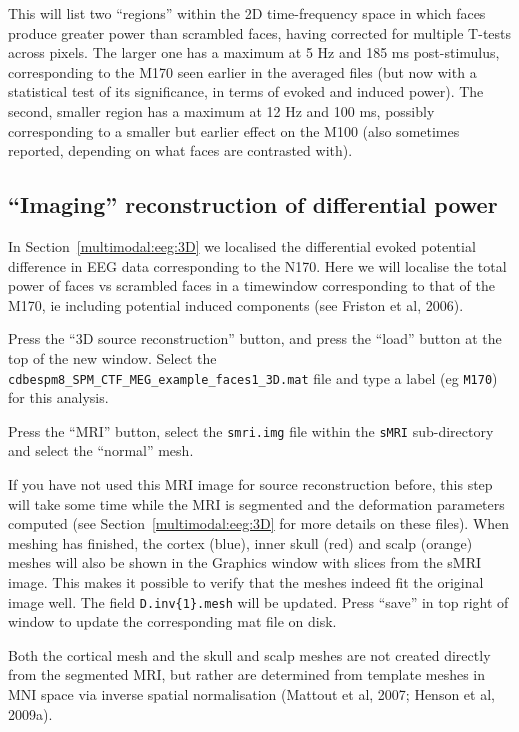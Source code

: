 This will list two ``regions'' within the 2D time-frequency space in which faces produce greater power than scrambled faces, having corrected for multiple T-tests across pixels. The larger one has a maximum at 5 Hz and 185 ms post-stimulus, corresponding to the M170 seen earlier in the averaged files (but now with a statistical test of its significance, in terms of evoked and induced power). The second, smaller region has a maximum at 12 Hz and 100 ms, possibly corresponding to a smaller but earlier effect on the M100 (also sometimes reported, depending on what faces are contrasted with).

\subsection{``Imaging'' reconstruction of differential power\label{multimodal:data:meg:recon_pow}}

In Section~\ref{multimodal:eeg:3D} we localised the differential evoked potential difference in EEG data corresponding to the N170.  Here we will localise the total power of faces vs scrambled faces in a timewindow corresponding to that of the M170, ie including potential induced components (see Friston et al, 2006).

Press the ``3D source reconstruction'' button, and press the ``load'' button at the top of the new window. Select the \texttt{cdbespm8\_SPM\_CTF\_MEG\_example\_faces1\_3D.mat} file and type a label (eg \texttt{M170}) for this analysis.

Press the ``MRI'' button, select the \texttt{smri.img} file within the \texttt{sMRI} sub-directory and select the ``normal'' mesh.

If you have not used this MRI image for source reconstruction before, this step will take some time while the MRI is segmented and the deformation parameters computed (see Section~\ref{multimodal:eeg:3D} for more details on these files). When meshing has finished, the cortex (blue), inner skull (red) and scalp (orange) meshes will also be shown in the Graphics window with slices from the sMRI image. This makes it possible to verify that the meshes indeed fit the original image well. The field \texttt{D.inv\{1\}.mesh} will be updated. Press ``save'' in top right of window to update the corresponding mat file on disk.

Both the cortical mesh and the skull and scalp meshes are not created directly from the segmented MRI, but rather are determined from template meshes in MNI space via inverse spatial normalisation (Mattout et al, 2007; Henson et al, 2009a).

